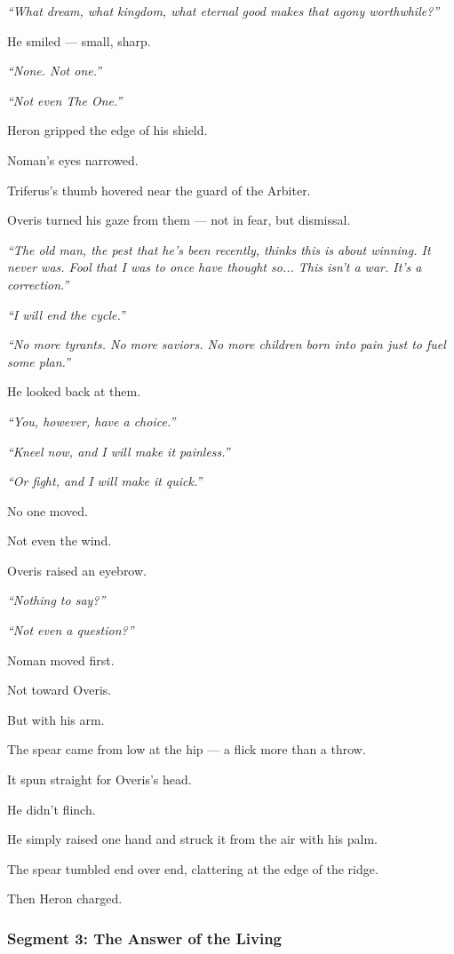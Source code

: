 \documentclass[9pt]{article}
\begin{document}
\textit{“What dream, what kingdom, what eternal good makes that agony worthwhile?”}

He smiled — small, sharp.

\textit{“None. Not one.”}

\textit{“Not even The One.”}

\bigskip

Heron gripped the edge of his shield.

Noman’s eyes narrowed.

Triferus’s thumb hovered near the guard of the Arbiter.

Overis turned his gaze from them — not in fear, but dismissal.

\textit{“The old man, the pest that he's been recently, thinks this is about winning. It never was. Fool that I was to once have thought so... This isn’t a war. It’s a correction.”}

\textit{“I will end the cycle.”}

\textit{“No more tyrants. No more saviors. No more children born into pain just to fuel some plan.”}

He looked back at them.

\textit{“You, however, have a choice.”}

\textit{“Kneel now, and I will make it painless.”}

\textit{“Or fight, and I will make it quick.”}

No one moved.

Not even the wind.

Overis raised an eyebrow.

\textit{“Nothing to say?”}

\textit{“Not even a question?”}

Noman moved first.

Not toward Overis.

But with his arm.

The spear came from low at the hip — a flick more than a throw.

It spun straight for Overis’s head.

He didn’t flinch.

He simply raised one hand and struck it from the air with his palm.

The spear tumbled end over end, clattering at the edge of the ridge.

Then Heron charged.

\newpage

\subsubsection*{Segment 3: The Answer of the Living}
\end{document}
